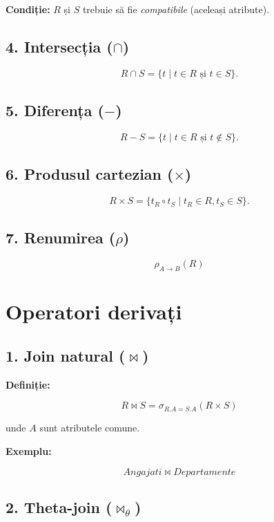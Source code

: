 \documentclass[12pt,a4paper]{article}
\begin{document}
\textbf{Condiție:} $R$ și $S$ trebuie să fie \textit{compatibile} (aceleași atribute).

\subsection{4. Intersecția ($\cap$)}


\[
R \cap S = \{ t \mid t \in R \text{ și } t \in S \}.
\]



\subsection{5. Diferența ($-$)}


\[
R - S = \{ t \mid t \in R \text{ și } t \notin S \}.
\]



\subsection{6. Produsul cartezian ($\times$)}


\[
R \times S = \{ t_R \circ t_S \mid t_R \in R, t_S \in S \}.
\]



\subsection{7. Renumirea ($\rho$)}


\[
\rho_{A \rightarrow B}(R)
\]



\section{Operatori derivați}

\subsection{1. Join natural ($\bowtie$)}
\textbf{Definiție:}


\[
R \bowtie S = \sigma_{R.A = S.A}(R \times S)
\]


unde $A$ sunt atributele comune.

\textbf{Exemplu:}


\[
Angajati \bowtie Departamente
\]



\subsection{2. Theta-join ($\bowtie_{\theta}$)}
\end{document}
